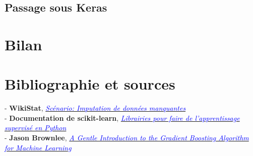 \documentclass[14pt, openany]{article}
\begin{document}
\subsection{Passage sous Keras}





\section{Bilan}

\section{Bibliographie et sources}

\begin{flushleft}
- \textbf{WikiStat}, \href{https://www.math.univ-toulouse.fr/~besse/Wikistat/pdf/st-scenar-app-idm.pdf}{\textit{\textcolor{blue}{Scénario: Imputation de données manquantes}}}\\
\medskip
- \textbf{Documentation de scikit-learn}, \href{http://scikit-learn.org/stable/supervised_learning.html#supervised-learning}{\textit{\textcolor{blue}{Librairies pour faire de l'apprentissage supervisé en Python}}}\\
\medskip
- \textbf{Jason Brownlee}, \href{https://machinelearningmastery.com/gentle-introduction-gradient-boosting-algorithm-machine-learning/}{\textit{\textcolor{blue}{A Gentle Introduction to the Gradient Boosting Algorithm for Machine Learning}}}\\
\end{flushleft}
\end{document}

